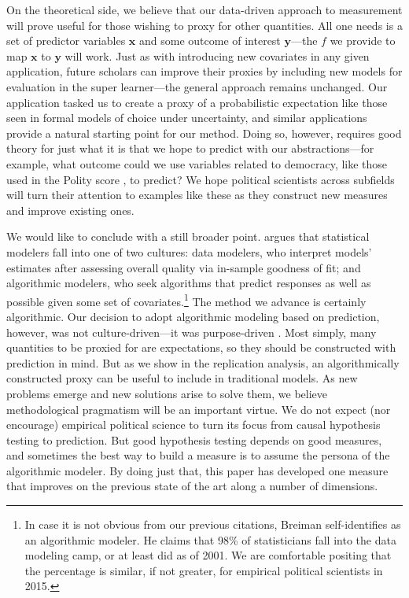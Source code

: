 On the theoretical side, we believe that our data-driven approach to measurement will prove useful for those wishing to proxy for other quantities.
All one needs is a set of predictor variables $\boldsymbol{x}$ and some outcome of interest $\boldsymbol{y}$---the $f$ we provide to map $\boldsymbol{x}$ to $\boldsymbol{y}$ will work.
Just as with introducing new covariates in any given application, future scholars can improve their proxies by including new models for evaluation in the super learner---the general approach remains unchanged.
Our application tasked us to create a proxy of a probabilistic expectation like those seen in formal models of choice under uncertainty, and similar applications provide a natural starting point for our method.
Doing so, however, requires good theory for just what it is that we hope to predict with our abstractions---for example, what outcome could we use variables related to democracy, like those used in the Polity score \citep{marshall2014}, to predict?
We hope political scientists across subfields will turn their attention to examples like these as they construct new measures and improve existing ones.

We would like to conclude with a still broader point.
\citet{Breiman:2001fd} argues that statistical modelers fall into one of two cultures: data modelers, who interpret models' estimates after assessing overall quality via in-sample goodness of fit; and algorithmic modelers, who seek algorithms that predict responses as well as possible given some set of covariates.\footnote{
  In case it is not obvious from our previous citations, Breiman self-identifies as an algorithmic modeler.
  He claims that 98\% of statisticians fall into the data modeling camp, or at least did as of 2001.
  We are comfortable positing that the percentage is similar, if not greater, for empirical political scientists in 2015.
}
The method we advance is certainly algorithmic.
Our decision to adopt algorithmic modeling based on prediction, however, was not culture-driven---it was purpose-driven \citep{clarke2012}.
Most simply, many quantities to be proxied for are expectations, so they should be constructed with prediction in mind.
But as we show in the replication analysis, an algorithmically constructed proxy can be useful to include in traditional models.
As new problems emerge and new solutions arise to solve them, we believe methodological pragmatism will be an important virtue.
We do not expect (nor encourage) empirical political science to turn its focus from causal hypothesis testing to prediction.
But good hypothesis testing depends on good measures, and sometimes the best way to build a measure is to assume the persona of the algorithmic modeler.
By doing just that, this paper has developed one measure that improves on the previous state of the art along a number of dimensions.

